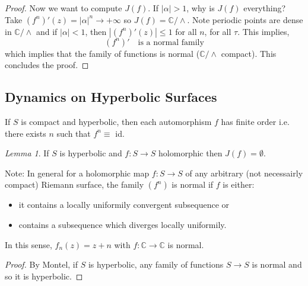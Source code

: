 \documentclass[a4paper, 11pt]{book}
\theoremstyle{definition}
\theoremstyle{remark}
\newtheorem{lemma}[theorem]{Lemma}
\begin{document}
\begin{proof}
         Now we want to compute $J(f)$. If $|\alpha|>1$, why is $J(f)$ everything?\\
         Take $(f^n)'(z) = |\alpha|^n \to +\infty$ so $J(f) = \mathbb{C}/\wedge$. Note periodic points are dense in $\mathbb{C}/\wedge$
         and if $|\alpha|<1$, then $|(f^n)'(z)|\leq 1$ for all $n$, for all $\tau$. This implies,
         \[ (f^n)'\quad\text{is a normal family} \]
         which implies that the family of functions is normal ($\mathbb{C}/\wedge$ compact). This concludes the proof.
    \end{proof}

    \subsection{Dynamics on Hyperbolic Surfaces}

    If $S$ is compact and hyperbolic, then each automorphism $f$ has finite order i.e. there exists $n$ such that $f^n \equiv$ id.

    \begin{lemma}
        If $S$ is hyperbolic and $f:S\to S$ holomorphic then $J(f) = \emptyset$.
    \end{lemma}

    Note: In general for a holomorphic map $f: S\to S$ of any arbitrary (not necessairly compact) Riemann surface, the family
    $(f^n)$ is normal if $f$ is either:
    \begin{itemize}
        \item it contains a locally uniformily convergent subsequence or
        \item contains a subsequence which diverges locally uniformily.
    \end{itemize}
    In this sense, $f_n(z) = z + n$ with $f:\mathbb{C}\to\mathbb{C}$ is normal.

    \begin{proof}
        By Montel, if $S$ is hyperbolic, any family of functions $S\to S$ is normal and so it is hyperbolic.
    \end{proof}
\end{document}
